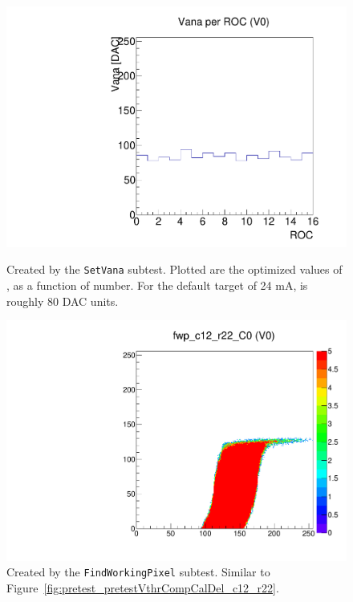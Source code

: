 \begin{figure}[!htp]
\centering
\begin{minipage}{0.45\textwidth}
  \includegraphics[width=1.0\textwidth]{figures/pretest_VanaSettings.pdf}
  \caption{Created by the {\tt SetVana} subtest.  
    Plotted are the optimized values of \vana, as a function of \roc number.
    For the default \iana target of 24 mA, \vana is roughly 80 DAC units.}
  \label{fig:pretest_VanaSettings}
\end{minipage}
\hspace{0.3cm}
\begin{minipage}{0.45\textwidth}
  \includegraphics[width=1.0\textwidth]{figures/pretest_fwp_c12_r22.pdf}
  \caption{Created by the {\tt FindWorkingPixel} subtest.
  Similar to Figure~\ref{fig:pretest_pretestVthrCompCalDel_c12_r22}.}
  \label{fig:pretest_fwp_c12_r22}
\end{minipage}
\end{figure}

